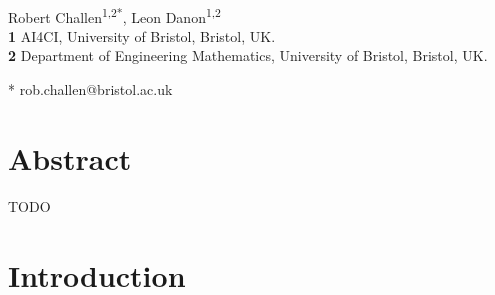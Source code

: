 \documentclass[10pt,letterpaper]{article}
\begin{document}
\vspace*{0.2in}

\begin{flushleft}
{\Large
\textbf{}
}
\newline
\\
Robert Challen\textsuperscript{1,2*},
Leon Danon\textsuperscript{1,2}
\\
\bigskip
\textbf{1} AI4CI, University of Bristol, Bristol, UK.\\
\textbf{2} Department of Engineering Mathematics, University of Bristol, Bristol, UK.\\
\bigskip

* rob.challen@bristol.ac.uk

\end{flushleft}
\section*{Abstract}

TODO


%

\linenumbers

\section*{Introduction}
\end{document}
